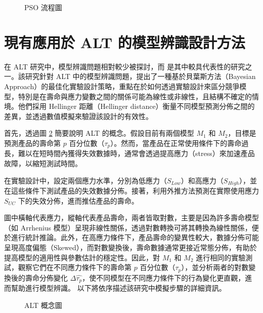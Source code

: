 \begin{figure}[H]
    \caption{PSO 流程圖}
\label{fig:PSO concept}
\end{figure}

\section{現有應用於 ALT 的模型辨識設計方法}

\hspace*{8mm} 在 ALT 研究中，模型辨識問題相對較少被探討，而 \cite{nasir2015simulation} 是其中較具代表性的研究之一。該研究針對 ALT 中的模型辨識問題，提出了一種基於貝葉斯方法（Bayesian Approach）的最佳化實驗設計策略，重點在於如何透過實驗設計來區分競爭模型，特別是在壽命與應力變數之間的關係可能為線性或非線性，且結構不確定的情境。他們採用 Hellinger 距離（Hellinger distance）衡量不同模型預測分佈之間的差異，並透過數值模擬來驗證該設計的有效性。

\hspace*{8mm} 首先，透過圖 \ref{fig:ALT concept} 簡要說明 ALT 的概念。假設目前有兩個模型 $M_1$ 和 $M_2$，目標是預測產品的壽命第 $p$ 百分位數（$\tau_p$）。然而，當產品在正常使用條件下的壽命過長，難以在短時間內獲得失效數據時，通常會透過提高應力（stress）來加速產品故障，以縮短測試時間。  

\hspace*{8mm} 在實驗設計中，設定兩個應力水準，分別為低應力（$S_{Low}$）和高應力（$S_{High}$），並在這些條件下測試產品的失效數據分佈。接著，利用外推方法預測在實際使用應力 $S_{UC}$ 下的失效分佈，進而推估產品的壽命。

\hspace*{8mm} 圖中橫軸代表應力，縱軸代表產品壽命，兩者皆取對數，主要是因為許多壽命模型（如 Arrhenius 模型）呈現非線性關係，透過對數轉換可將其轉換為線性關係，便於進行統計推論。此外，在高應力條件下，產品壽命的變異性較大，數據分佈可能呈現高度偏態（Skewed），而對數變換後，壽命數據通常更接近常態分佈，有助於提高模型的適用性與參數估計的穩定性。因此，對 $M_1$ 和 $M_2$ 進行相同的實驗測試，觀察它們在不同應力條件下的壽命第 $p$ 百分位數（$\tau_p$），並分析兩者的對數變換後的壽命分佈變化 $\Delta\hat{\tau_p}$，使不同模型在不同應力條件下的行為變化更直觀，進而幫助進行模型辨識。 以下將依序描述該研究中模擬步驟的詳細資訊。
 
\begin{figure}[H]
    \caption{ALT 概念圖 \citep{nasir2015simulation}}
\label{fig:ALT concept}
\end{figure}

